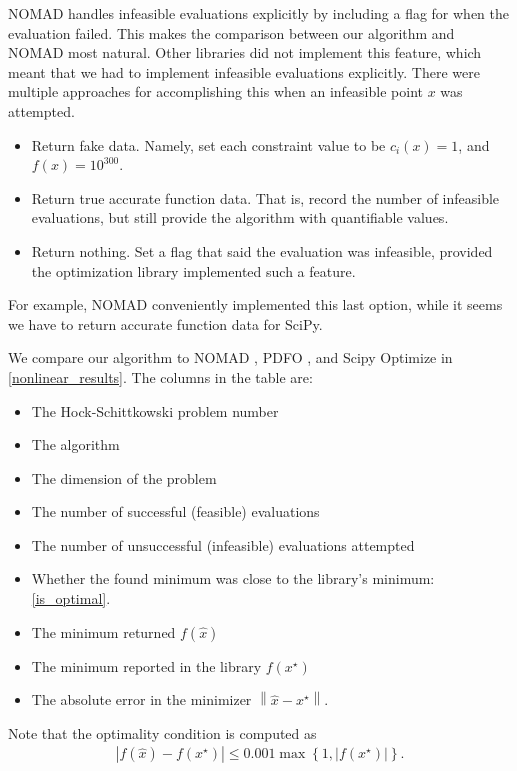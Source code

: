 NOMAD handles infeasible evaluations explicitly by including a flag for when the evaluation failed.
This makes the comparison between our algorithm and NOMAD most natural.
Other libraries did not implement this feature, which meant that we had to implement infeasible evaluations explicitly.
There were multiple approaches for accomplishing this when an infeasible point $x$ was attempted.

\begin{itemize}
\item Return fake data. Namely, set each constraint value to be $c_i(x) = 1$, and $f(x) = 10^{300}$.
\item Return true accurate function data. That is, record the number of infeasible evaluations, but still provide the algorithm with quantifiable values.
\item Return nothing. Set a flag that said the evaluation was infeasible, provided the optimization library implemented such a feature.
\end{itemize}
For example, NOMAD conveniently implemented this last option, while it seems we have to return accurate function data for SciPy.



We compare our algorithm to NOMAD \cite{AMAIOUA201813}, PDFO \cite{PDFO}, and Scipy Optimize
in \cref{nonlinear_results}.
The columns in the table are:
\begin{itemize}
\item The Hock-Schittkowski problem number
\item The algorithm
\item The dimension of the problem
\item The number of successful (feasible) evaluations
\item The number of unsuccessful (infeasible) evaluations attempted
\item Whether the found minimum was close to the library's minimum: \cref{is_optimal}.
\item The minimum returned $f(\hat x)$
\item The minimum reported in the library $f(x^{\star})$
\item The absolute error in the minimizer $\left\|\hat x - x^{\star}\right\|$.
\end{itemize}
Note that the optimality condition is computed as
\begin{align}
\left|f\left(\hat x\right) - f\left(x^{\star}\right)\right| \le 0.001 \max\left\{1, \left|f\left(x^{\star}\right)\right|\right\}. \label{is_optimal}
\end{align}

